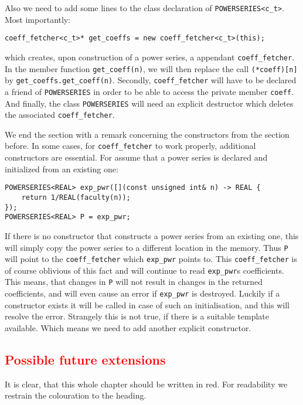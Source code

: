 \documentclass{article}
\newcommand{\code}[1]{\texttt{#1}}
\newcommand{\func}[1]{\texttt{#1}}
\newcommand{\temp}[1]{\textcolor{red}{#1}}
\begin{document}
Also we need to add some lines to the class declaration of \func{POWERSERIES<c\_t>}. Most importantly:
\begin{lstlisting}
coeff_fetcher<c_t>* get_coeffs = new coeff_fetcher<c_t>(this);
\end{lstlisting}
which creates, upon construction of a power series, a appendant \code{coeff\_fetcher}. In the member function \code{get\_coeff(n)}, we will then replace the call \code{(*coeff)[n]} by \code{get\_coeffs.get\_coeff(n)}. Secondly, \code{coeff\_fetcher} will have to be declared a friend of \func{POWERSERIES} in order to be able to access the private member \code{coeff}. And finally, the class \func{POWERSERIES} will need an explicit destructor which deletes the associated \code{coeff\_fetcher}.

We end the section with a remark concerning the constructors from the section before. In some cases, for \code{coeff\_fetcher} to work properly, additional constructors are essential. For assume that a power series is declared and initialized from an existing one:
\begin{lstlisting}
POWERSERIES<REAL> exp_pwr([](const unsigned int& n) -> REAL {
	return 1/REAL(faculty(n));
});
POWERSERIES<REAL> P = exp_pwr;
\end{lstlisting}
If there is no constructor that constructs a power series from an existing one, this will simply copy the power series to a different location in the memory. Thus \code{P} will point to the \code{coeff\_fetcher} which \code{exp\_pwr} points to. This \code{coeff\_fetcher} is of course oblivious of this fact and will continue to read \code{exp\_pwr}s coefficients. This means, that changes in \code{P} will not result in changes in the returned coefficients, and will even cause an error if \code{exp\_pwr} is destroyed. Luckily if a constructor exists it will be called in case of such an initialisation, and this will resolve the error. Strangely this is not true, if there is a suitable template available. Which means we need to add another explicit constructor.

\subsection{\temp{Possible future extensions}}

It is clear, that this whole chapter should be written in red. For readability we restrain the colouration to the heading.

{}

\end{document}
